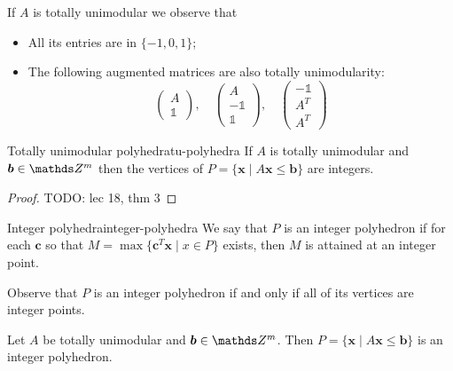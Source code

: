 \documentclass[12pt]{extarticle}
\renewcommand{\vec}[1]{\bm{#1}}
\begin{document}
\begin{remark}
	If $A$ is totally unimodular we observe that
	\begin{itemize}
		\item All its entries are in $\{-1, 0, 1\}$;
		\item The following augmented matrices are also totally unimodularity:
		      \begin{equation}
			      \begin{pmatrix}
				      A \\ \mathds 1
			      \end{pmatrix},
			      \quad
			      \begin{pmatrix}
				      A \\ - \mathds 1 \\ \mathds 1
			      \end{pmatrix},
			      \quad
			      \begin{pmatrix}
				      - \mathds 1 \\ A^T \\ A^T
			      \end{pmatrix}
		      \end{equation}
	\end{itemize}
\end{remark}

\begin{theorem}{Totally unimodular polyhedra}{tu-polyhedra}
	If $A$ is totally unimodular and $\vec b \in \Z^m$ then the vertices of
	$P = \{ \vec x \mid A \vec x \leq \vec b \}$ are integers.
\end{theorem}

\begin{proof}
	TODO: lec 18, thm 3
\end{proof}

\begin{definition}{Integer polyhedra}{integer-polyhedra}
	We say that $P$ is an integer polyhedron if for each $\vec c$ so that
	$M = \max\{\vec c^T \vec x \mid x \in P\}$ exists, then $M$ is attained at an integer point.
\end{definition}

Observe that $P$ is an integer polyhedron if and only if all of its vertices are integer points.

\begin{corollary}{}{}
	Let $A$ be totally unimodular and $\vec b \in \Z^m$. Then
	$P = \{ \vec x \mid A \vec x \leq \vec b \}$ is an integer polyhedron.
\end{corollary}
\end{document}
